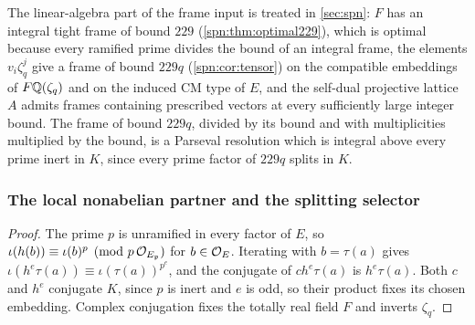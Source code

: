 The linear-algebra part of the frame input is treated in \cref{sec:spn}: $F$
has an integral tight frame of bound $229$ (\cref{spn:thm:optimal229}), which is optimal
because every ramified prime divides the bound of an integral frame, the elements
$v_i\zeta_q^j$ give a frame of bound $229q$ (\cref{spn:cor:tensor}) on the compatible embeddings of
$F\mathbb{Q}(\zeta_q)$ and on the induced CM type of $E$, and the self-dual projective
lattice $A$ admits frames containing prescribed vectors at every sufficiently
large integer bound. The frame of bound $229q$, divided by its bound and with
multiplicities multiplied by the bound, is a Parseval resolution which is
integral above every prime inert in $K$, since every prime factor of $229q$
splits in $K$.

\subsubsection{The local nonabelian partner and the splitting selector}


\begin{proof}
The prime $p$ is unramified in every factor of $E$, so
$\iota(h(b))\equiv\iota(b)^p\pmod{p\,\mathcal{O}_{E_{\mathfrak p}}}$ for
$b\in\mathcal{O}_E$. Iterating with $b=\tau(a)$ gives
$\iota(h^e\tau(a))\equiv\iota(\tau(a))^{p^e}$, and the conjugate of
$ch^e\tau(a)$ is $h^e\tau(a)$. Both $c$ and $h^e$ conjugate $K$, since $p$ is
inert and $e$ is odd, so their product fixes its chosen embedding. Complex
conjugation fixes the totally real field $F$ and inverts $\zeta_q$.
\end{proof}

